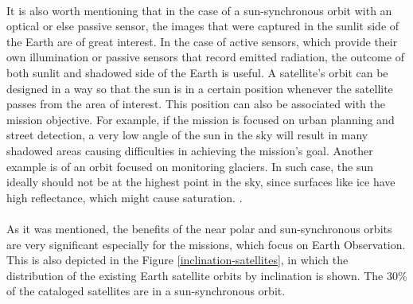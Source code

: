 \begin{itemize}
\begin{itemize}
	\\
	It is also worth mentioning that in the case of a sun-synchronous orbit with an optical or else passive sensor, the images that were captured in the sunlit side of the Earth are of great interest. In the case of active sensors, which provide their own illumination or passive sensors that record emitted radiation, the outcome of both sunlit and shadowed side of the Earth is useful.	A satellite's orbit can be designed in a way so that the sun is in a certain position whenever the satellite passes from the area of interest. This position can also be associated with the mission objective. For example, if the mission is focused on urban planning and street detection, a very low angle of the sun in the sky will result in many shadowed areas causing difficulties in achieving the mission's goal. Another example is of an orbit focused on monitoring glaciers. In such case, the sun ideally should not be at the highest point in the sky, since surfaces like ice have high reflectance, which might cause saturation. 
	 \cite{Campbell}.\\
	\\
	As it was mentioned, the benefits of the near polar and sun-synchronous orbits are very significant especially for the missions, which focus on Earth Observation. This is also depicted in the Figure \ref{inclination-satellites}, in which the distribution of the existing Earth satellite orbits by inclination is shown. The 30\% of the cataloged satellites are in a sun-synchronous orbit.
	\end{itemize}
\end{itemize}

